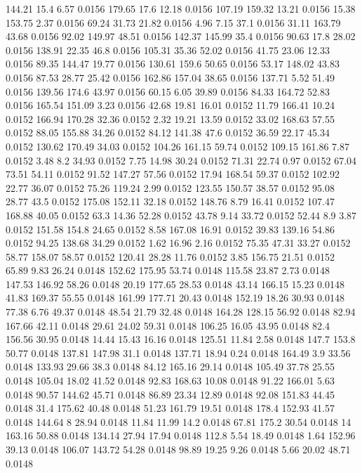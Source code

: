144.21	15.4	6.57	0.0156
179.65	17.6	12.18	0.0156
107.19	159.32	13.21	0.0156
15.38	153.75	2.37	0.0156
69.24	31.73	21.82	0.0156
4.96	7.15	37.1	0.0156
31.11	163.79	43.68	0.0156
92.02	149.97	48.51	0.0156
142.37	145.99	35.4	0.0156
90.63	17.8	28.02	0.0156
138.91	22.35	46.8	0.0156
105.31	35.36	52.02	0.0156
41.75	23.06	12.33	0.0156
89.35	144.47	19.77	0.0156
130.61	159.6	50.65	0.0156
53.17	148.02	43.83	0.0156
87.53	28.77	25.42	0.0156
162.86	157.04	38.65	0.0156
137.71	5.52	51.49	0.0156
139.56	174.6	43.97	0.0156
60.15	6.05	39.89	0.0156
84.33	164.72	52.83	0.0156
165.54	151.09	3.23	0.0156
42.68	19.81	16.01	0.0152
11.79	166.41	10.24	0.0152
166.94	170.28	32.36	0.0152
2.32	19.21	13.59	0.0152
33.02	168.63	57.55	0.0152
88.05	155.88	34.26	0.0152
84.12	141.38	47.6	0.0152
36.59	22.17	45.34	0.0152
130.62	170.49	34.03	0.0152
104.26	161.15	59.74	0.0152
109.15	161.86	7.87	0.0152
3.48	8.2	34.93	0.0152
7.75	14.98	30.24	0.0152
71.31	22.74	0.97	0.0152
67.04	73.51	54.11	0.0152
91.52	147.27	57.56	0.0152
17.94	168.54	59.37	0.0152
102.92	22.77	36.07	0.0152
75.26	119.24	2.99	0.0152
123.55	150.57	38.57	0.0152
95.08	28.77	43.5	0.0152
175.08	152.11	32.18	0.0152
148.76	8.79	16.41	0.0152
107.47	168.88	40.05	0.0152
63.3	14.36	52.28	0.0152
43.78	9.14	33.72	0.0152
52.44	8.9	3.87	0.0152
151.58	154.8	24.65	0.0152
8.58	167.08	16.91	0.0152
39.83	139.16	54.86	0.0152
94.25	138.68	34.29	0.0152
1.62	16.96	2.16	0.0152
75.35	47.31	33.27	0.0152
58.77	158.07	58.57	0.0152
120.41	28.28	11.76	0.0152
3.85	156.75	21.51	0.0152
65.89	9.83	26.24	0.0148
152.62	175.95	53.74	0.0148
115.58	23.87	2.73	0.0148
147.53	146.92	58.26	0.0148
20.19	177.65	28.53	0.0148
43.14	166.15	15.23	0.0148
41.83	169.37	55.55	0.0148
161.99	177.71	20.43	0.0148
152.19	18.26	30.93	0.0148
77.38	6.76	49.37	0.0148
48.54	21.79	32.48	0.0148
164.28	128.15	56.92	0.0148
82.94	167.66	42.11	0.0148
29.61	24.02	59.31	0.0148
106.25	16.05	43.95	0.0148
82.4	156.56	30.95	0.0148
14.44	15.43	16.16	0.0148
125.51	11.84	2.58	0.0148
147.7	153.8	50.77	0.0148
137.81	147.98	31.1	0.0148
137.71	18.94	0.24	0.0148
164.49	3.9	33.56	0.0148
133.93	29.66	38.3	0.0148
84.12	165.16	29.14	0.0148
105.49	37.78	25.55	0.0148
105.04	18.02	41.52	0.0148
92.83	168.63	10.08	0.0148
91.22	166.01	5.63	0.0148
90.57	144.62	45.71	0.0148
86.89	23.34	12.89	0.0148
92.08	151.83	44.45	0.0148
31.4	175.62	40.48	0.0148
51.23	161.79	19.51	0.0148
178.4	152.93	41.57	0.0148
144.64	8	28.94	0.0148
11.84	11.99	14.2	0.0148
67.81	175.2	30.54	0.0148
14	163.16	50.88	0.0148
134.14	27.94	17.94	0.0148
112.8	5.54	18.49	0.0148
1.64	152.96	39.13	0.0148
106.07	143.72	54.28	0.0148
98.89	19.25	9.26	0.0148
5.66	20.02	48.71	0.0148
